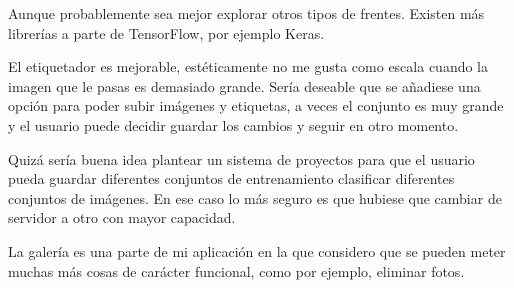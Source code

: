 Aunque probablemente sea mejor explorar otros tipos de frentes. Existen más librerías a parte de TensorFlow, por ejemplo Keras.

El etiquetador es mejorable, estéticamente no me gusta como escala cuando la imagen que le pasas es demasiado grande.
Sería deseable que se añadiese una opción para poder subir imágenes y etiquetas, a veces el conjunto es muy grande y el usuario puede decidir guardar los cambios y seguir en otro momento.

Quizá sería buena idea plantear un sistema de proyectos para que el usuario pueda guardar diferentes conjuntos de entrenamiento clasificar diferentes conjuntos de imágenes. En ese caso lo más seguro es que hubiese que cambiar de servidor a otro con mayor capacidad.

La galería es una parte de mi aplicación en la que considero que se pueden meter muchas más cosas de carácter funcional, como por ejemplo, eliminar fotos.

